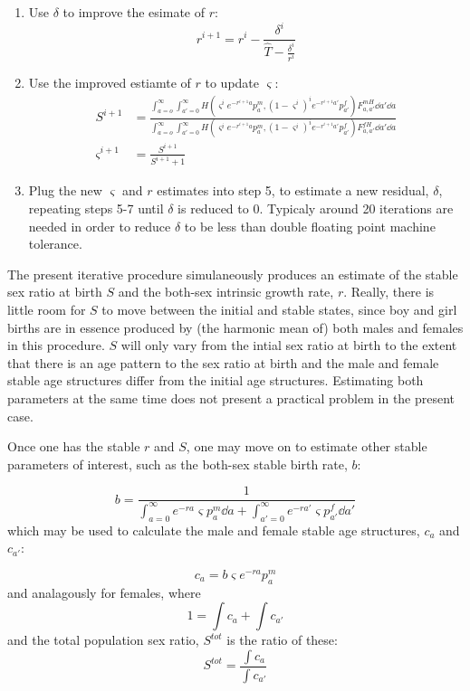 \begin{enumerate}
  \item Use $\delta$ to improve the esimate of $r$:
  \begin{equation}
  r^{i+1} = r^i - \frac{\delta^i}{\widehat{T} - \frac{\delta^i}{r^i}}
  \end{equation}
  \item Use the improved estiamte of $r$ to update $\varsigma$:
  \begin{align}
  S^{i+1} &= \frac{\int_{a=o}^\infty \int_{a'=0}^\infty H(\varsigma^i
  e^{-r^{i+1}a} p_a^m, (1-\varsigma^i)^i e^{-r^{i+1}a'}p_{a'}^f) F_{a,a'}^{mH} \dd a' \dd a
  }{\int_{a=o}^\infty \int_{a'=0}^\infty H(\varsigma^i e^{-r^{i+1}a}
  p_a^m, (1-\varsigma^i)^i e^{-r^{i+1}a'}p_{a'}^f) F_{a,a'}^{fH} \dd a' \dd a }
  \\
  \varsigma^{i+1} &= \frac{S^{i+1}}{S^{i+1}+1}
  \end{align}
  \item Plug the new $\varsigma$ and $r$ estimates into step 5, to estimate a
  new residual, $\delta$, repeating steps 5-7 until $\delta$ is reduced to 0.
  Typicaly around 20 iterations are needed in order to reduce $\delta$ to
  be less than double floating point machine tolerance.
\end{enumerate}

The present iterative procedure simulaneously produces an estimate of the stable
sex ratio at birth $S$ and the both-sex intrinsic growth rate, $r$. Really,
there is little room for $S$ to move between the initial and stable states,
since boy and girl births are in essence produced by (the harmonic mean of) both
males and females in this procedure. $S$
will only vary from the intial sex ratio at birth to the extent that there is
an age pattern to the sex ratio at birth and the male and female stable age
structures differ from the initial age structures. Estimating both parameters at
the same time does not present a practical problem in the present case.

Once one has the stable $r$ and $S$, one may move on to estimate other stable
parameters of interest, such as the both-sex stable birth rate, $b$:

\begin{equation}
b = \frac{1}{\int_{a = 0}^\infty e^{-ra} \varsigma p_a^m \dd a + \int_{a' =
0}^\infty e^{-ra'} \varsigma p_{a'}^f \dd a'}
\end{equation}
which may be used to calculate the male and female stable age structures, $c_a$
and $c_{a'}$:

\begin{equation}
c_a =  b \varsigma  e^{-ra} p_a^m
\end{equation}
and analagously for females, where
\begin{equation}
1 = \int c_a + \int c_{a'}
\end{equation}
and the total population sex ratio, $S^{tot}$ is the ratio of these:
\begin{equation}
S^{tot} = \frac{\int c_a}{\int c_{a'}}
\end{equation}

